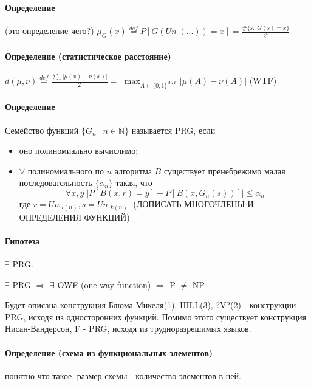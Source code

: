 \documentclass[12pt, a4paper]{article}
\newcommand{\uniform}{Un \;}
\newcommand{\bool}{\{0, 1\}}
\begin{document}
\paragraph{Определение} (это определение чего?) $\mu_G(x) \stackrel{def}{=} P[G(\uniform(...)) = x] = \frac{\#\{s : \; G(s) = x\}}{2^k}$

\paragraph{Определение (статистическое расстояние)} $d(\mu, \nu) \stackrel{def}{=} \frac{\sum_x |\mu(x) - \nu(x)|}{2} = $
$\max_{A \subset \bool^{WTF}} |\mu(A) - \nu(A)|$ (WTF) 

\paragraph{Определение} Семейство функций $\{G_n \; | \: n \in \mathbb{N}\}$ называется PRG, если
\begin{itemize}
 \item оно полиномиально вычислимо;
 \item $\forall$ полиномиального по $n$ алгоритма $B$ существует пренебрежимо малая последовательность $\{\alpha_n\}$ такая, что
 $$\forall x, y \; |P[B(x, r) = y] - P[B(x, G_n(s))]| \leq \alpha_n$$
 где $r = \uniform_{l(n)}, s = \uniform_{k(n)}$. (ДОПИСАТЬ МНОГОЧЛЕНЫ И ОПРЕДЕЛЕНИЯ ФУНКЦИЙ)
\end{itemize}

\paragraph{Гипотеза} $\exists$ PRG.

$\exists$ PRG $\Rightarrow$ $\exists$ OWF (one-way function) $\Rightarrow$ P $\neq$ NP



Будет описана конструкция Блюма-Микеля(1), HILL(3), ?V?(2) - конструкции PRG, исходя из односторонних функций. Помимо этого существует конструкция Нисан-Вандерсон, F - PRG, исходя из трудноразрешимых языков.

\paragraph{Определение (схема из функциональных элементов)} понятно что такое. размер схемы - количество элементов в ней.

\paragraph{}
\end{document}
